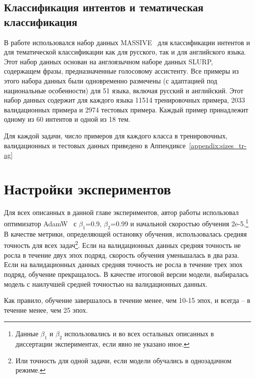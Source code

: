 \subsection{Классификация интентов и тематическая классификация }
В работе использовался набор данных {MASSIVE}~\cite{massive} для классификации интентов и для тематической классификации как для русского, так и для английского языка. Этот набор данных основан на англоязычном наборе данных SLURP\cite{slurp}, содержащем фразы, предназначенные голосовому ассистенту.
 Все примеры из этого набора данных были одновременно размечены (с адаптацией под национальные особенности) для 51 языка, включая русский и английский. Этот набор данных содержит для каждого языка 11514 тренировочных примера, 2033 валидационных примера и 2974 тестовых примера. Каждый пример принадлежит одному из 60 интентов и одной из 18 тем. 

Для каждой задачи, число примеров для каждого класса в тренировочных, валидационных и тестовых данных приведено в Аппендиксе~\ref{appendix:sizes_tr-ag} 

\section {Настройки экспериментов}\label{ch:tr-ag:settings}
Для всех описанных в данной главе экспериментов, автор работы использовал оптимизатор AdamW~\cite{kingma_2014} с  $\beta_1$=0.9, $\beta_2$=0.99 и начальной скоростью обучения 2e-5.\footnote{Данные $\beta_1$ и $\beta_2$ использовались и во всех остальных описанных в диссертации экспериментах, если явно не указано иное.}  В качестве метрики, определяющей остановку обучения, использовалась средняя точность для всех задач\footnote{Или точность для одной задачи, если модели обучались в однозадачном режиме.}. Если на валидационных данных средняя точность не росла в течение двух эпох подряд, скорость обучения уменьшалась в два раза. Если на валидационных данных средняя точность не росла в течение трех эпох подряд, обучение прекращалось. В качестве итоговой версии модели, выбиралась модель с наилучшей средней точностью на валидационных данных.

Как правило, обучение завершалось в течение менее, чем 10-15 эпох, и всегда -- в течение менее, чем 25 эпох. 

